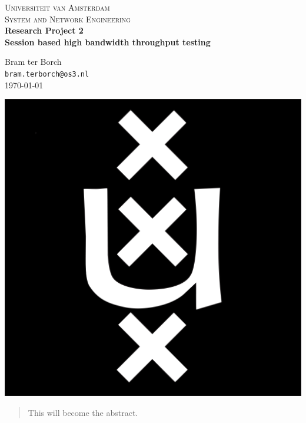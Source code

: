 \documentclass[11pt,a4paper,notitlepage,openany]{report}
\begin{document}
\begin{titlingpage}
\noindent
\begin{center}
\textsc{\Large Universiteit van Amsterdam}\\[0.2cm]
\textsc{\large System and Network Engineering}\\[0.5cm]

{ \large \bfseries Research Project 2}\\[0.2cm]
{ \LARGE \bfseries Session based high bandwidth throughput testing}\\[0.5cm]
\begin{footnotesize}
Bram ter Borch\\
\texttt{bram.terborch@os3.nl}\\[0.5cm]
{\large \mydate\today}
\end{footnotesize}

\centering
\vspace{2.0cm}
\includegraphics[scale=0.07]{images/uva_logo.png}
\vspace*{2.5cm}
\begin{abstract}
This will become the abstract.
\end{abstract}
\end{center}
\end{titlingpage}

\renewcommand{\contentsname}{Table of Contents}
\setcounter{tocdepth}{1}
\tableofcontents
{}
\begin{flushleft}
\end{flushleft}







\nocite{*}


%
%
\end{document}
